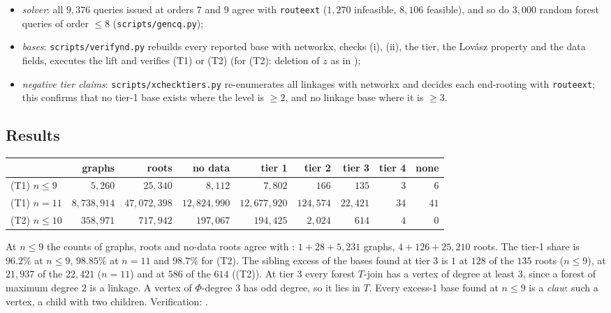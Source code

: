 \documentclass[11pt]{amsart}
\theoremstyle{definition}
\theoremstyle{remark}
\renewcommand{\_}{\oldunderscore\allowbreak}
\begin{document}
\begin{itemize}[leftmargin=*]
\item \emph{solver}: all $9{,}376$ queries issued at orders $7$ and $9$ agree with \texttt{route\_ext}
($1{,}270$ infeasible, $8{,}106$ feasible), and so do $3{,}000$ random forest queries of order
$\le8$ (\texttt{scripts/gen\_cq.py});
\item \emph{bases}: \texttt{scripts/verify\_nd.py} rebuilds every reported base with networkx,
checks (i), (ii), the tier, the Lov\'asz property and the data fields, executes the lift and
verifies (T1) or (T2) (for (T2): deletion of $z$ as in \cite[Theorem~4.5]{T2});
\item \emph{negative tier claims}: \texttt{scripts/xcheck\_tiers.py} re-enumerates all linkages with
networkx and decides each end-rooting with \texttt{route\_ext}; this confirms that no tier-1 base
exists where the level is $\ge2$, and no linkage base where it is $\ge3$.
\end{itemize}

\subsection{Results}
\begin{center}
\begin{tabular}{lrrrrrrrr}
\toprule
& graphs & roots & no data & tier 1 & tier 2 & tier 3 & tier 4 & none\\
\midrule
(T1) $n\le 9$ & $5{,}260$ & $25{,}340$ & $8{,}112$ & $7{,}802$ & $166$ & $135$ & $3$ & $6$\\
(T1) $n=11$ & $8{,}738{,}914$ & $47{,}072{,}398$ & $12{,}824{,}990$ & $12{,}677{,}920$ & $124{,}574$
& $22{,}421$ & $34$ & $41$\\
(T2) $n\le 10$ & $358{,}971$ & $717{,}942$ & $197{,}067$ & $194{,}425$ & $2{,}024$ & $614$ & $4$ &
$0$\\
\bottomrule
\end{tabular}
\end{center}
At $n\le 9$ the counts of graphs, roots and no-data roots agree with \cite{T2}: $1+28+5{,}231$
graphs, $4+126+25{,}210$ roots. The tier-1 share is $96.2\%$ at $n\le9$, $98.85\%$ at $n=11$ and
$98.7\%$ for (T2). The sibling excess of the bases found at tier 3 is $1$ at $128$ of the $135$
roots ($n\le9$), at $21{,}937$ of the $22{,}421$ ($n=11$) and at $586$ of the $614$ ((T2)). At tier
$3$ every forest $T$-join has a vertex of degree at least $3$, since a forest of maximum degree $2$
is a linkage. A vertex of $\Phi$-degree $3$ has odd degree, so it lies in $T$. Every excess-1 base
found at $n\le9$ is a \emph{claw}: such a vertex, a child with two children. Verification:
\VERIFYSTATUS.
\end{document}
